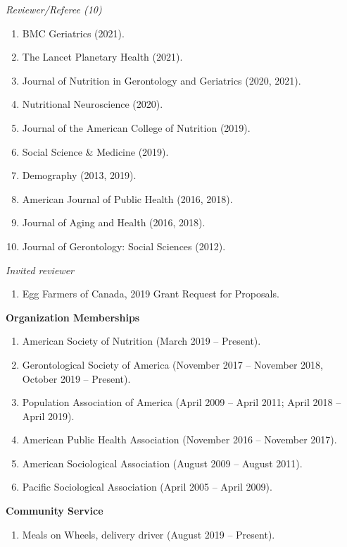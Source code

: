 \documentclass[
]{article}
\providecommand{\tightlist}{%
  \setlength{\itemsep}{0pt}\setlength{\parskip}{0pt}}
\begin{document}
\emph{Reviewer/Referee (10)}

\begin{enumerate}
\def\labelenumi{\arabic{enumi}.}
\item
  BMC Geriatrics (2021).
\item
  The Lancet Planetary Health (2021).
\item
  Journal of Nutrition in Gerontology and Geriatrics (2020, 2021).
\item
  Nutritional Neuroscience (2020).
\item
  Journal of the American College of Nutrition (2019).
\item
  Social Science \& Medicine (2019).
\item
  Demography (2013, 2019).
\item
  American Journal of Public Health (2016, 2018).
\item
  Journal of Aging and Health (2016, 2018).
\item
  Journal of Gerontology: Social Sciences (2012).
\end{enumerate}

\emph{Invited reviewer}

\begin{enumerate}
\def\labelenumi{\arabic{enumi}.}
\tightlist
\item
  Egg Farmers of Canada, 2019 Grant Request for Proposals.
\end{enumerate}

\textbf{Organization Memberships}

\begin{enumerate}
\def\labelenumi{\arabic{enumi}.}
\item
  American Society of Nutrition (March 2019 -- Present).
\item
  Gerontological Society of America (November 2017 -- November 2018,
  October 2019 -- Present).
\item
  Population Association of America (April 2009 -- April 2011; April
  2018 -- April 2019).
\item
  American Public Health Association (November 2016 -- November 2017).
\item
  American Sociological Association (August 2009 -- August 2011).
\item
  Pacific Sociological Association (April 2005 -- April 2009).
\end{enumerate}

\textbf{Community Service}

\begin{enumerate}
\def\labelenumi{\arabic{enumi}.}
\tightlist
\item
  Meals on Wheels, delivery driver (August 2019 -- Present).
\end{enumerate}
\end{document}
